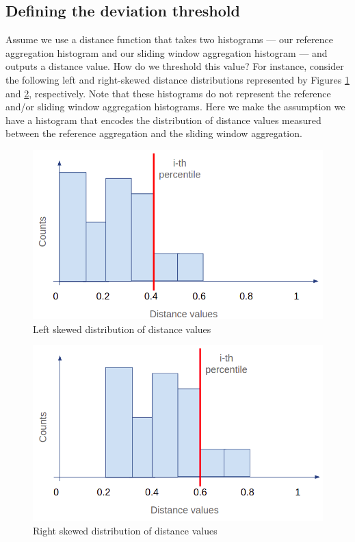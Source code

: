 \iffalse
\subsection*{Defining the deviation threshold}
Assume we use a distance function that takes two histograms --- our reference aggregation histogram and our sliding window aggregation histogram --- and outputs a distance value. How do we threshold this value? For instance, consider the following left and right-skewed distance distributions represented by Figures \ref{fig:skewed-left-distro} and \ref{fig:skewed-right-distro}, respectively. Note that these histograms do not represent the reference and/or sliding window aggregation histograms. Here we make the assumption we have a histogram that encodes the distribution of distance values measured between the reference aggregation and the sliding window aggregation.

\begin{figure}[!htb]
    \begin{center}
      \includegraphics[scale=0.4]{figures/skewed-left-distro.png}
      \caption[]{Left skewed distribution of distance values}
      \label{fig:skewed-left-distro}
    \end{center}
\end{figure}

\begin{figure}[!htb]
    \begin{center}
      \includegraphics[scale=0.4]{figures/skewed-right-distro.png}
      \caption[]{Right skewed distribution of distance values}
      \label{fig:skewed-right-distro}
    \end{center}
\end{figure}

